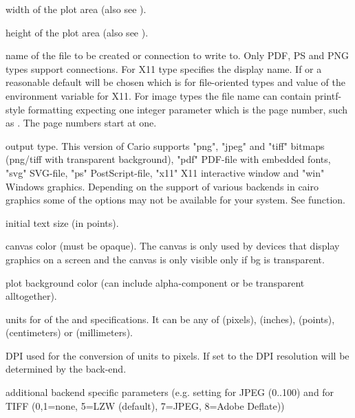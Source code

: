 \begin{Arguments}
\begin{ldescription}
\item[\code{width}] width of the plot area (also see ).
\item[\code{height}] height of the plot area (also see ).
\item[\code{file}] name of the file to be created or connection to write
to. Only PDF, PS and PNG types support connections. For X11
type  specifies the display name. If  or
 a reasonable default will be chosen which is
 for file-oriented types and value of the
 environment variable for X11. For image types
the file name can contain printf-style formatting expecting
one integer parameter which is the page number, such as
. The page numbers start at one.
\item[\code{type}] output type. This version of Cario supports "png", "jpeg"
and "tiff" bitmaps (png/tiff with transparent background), "pdf"
PDF-file with embedded fonts, "svg" SVG-file, "ps" PostScript-file,
"x11" X11 interactive window and "win" Windows graphics.
Depending on the support of various backends in cairo graphics some
of the options may not be available for your system. See
 function.
\item[\code{pointsize}] initial text size (in points).
\item[\code{canvas}] canvas color (must be opaque). The canvas is only used
by devices that display graphics on a screen and the canvas is only
visible only if bg is transparent.
\item[\code{bg}] plot background color (can include alpha-component or be
transparent alltogether).
\item[\code{units}] units for of the  and 
specifications. It can be any of  (pixels),
 (inches),  (points), 
(centimeters) or  (millimeters).
\item[\code{dpi}] DPI used for the conversion of units to pixels. If set to
 the DPI resolution will be determined by the
back-end.
\item[\code{...}] additional backend specific parameters (e.g. 
setting for JPEG (0..100) and  for TIFF
(0,1=none, 5=LZW (default), 7=JPEG, 8=Adobe Deflate))   


\end{ldescription}
\end{Arguments}

